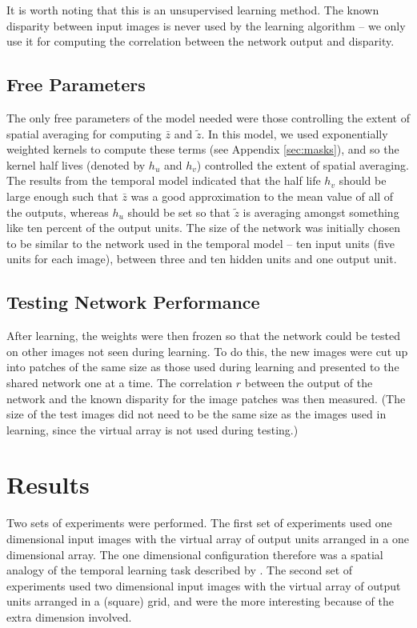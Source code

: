 \documentclass[a4paper]{article}
\newcommand{\zbar}{\bar{z}}
\newcommand{\ztilde}{\tilde{z}}
\begin{document}
It is worth noting that this is an unsupervised learning method. The
known disparity between input images is never used by the learning
algorithm -- we only use it for computing the correlation between the
network output and disparity.



\subsection{Free Parameters}

The only free parameters of the model needed were those controlling
the extent of spatial averaging for computing $\zbar$ and $\ztilde$.
In this model, we used exponentially weighted kernels to compute these
terms (see Appendix \ref{sec:masks}), and so the kernel half lives
(denoted by $h_u$ and $h_v$) controlled the extent of spatial averaging.
The results from the temporal model indicated that the half life $h_v$
should be large enough such that $\zbar$ was a good approximation to
the mean value of all of the outputs, whereas $h_u$ should be set so that
$\ztilde$ is averaging amongst something like ten percent of the output
units.  The size of the network was initially chosen to be similar to
the network used in the temporal model -- ten input units (five units
for each image), between three and ten hidden units and one output
unit.


\subsection{Testing Network Performance}

After learning, the weights were then frozen so that the network could
be tested on other images not seen during learning.  To do this, the
new images were cut up into patches of the same size as those used
during learning and presented to the shared network one at a time.
The correlation $r$ between the output of the network and the known
disparity for the image patches was then measured.  (The size of the
test images did not need to be the same size as the images used in
learning, since the virtual array is not used during testing.)


\section{Results}


Two sets of experiments were performed.  The first set of experiments
used one dimensional input images with the virtual array of output units
arranged in a one dimensional array.  The one dimensional
configuration therefore was a spatial analogy of the temporal learning
task described by \cite{stone95b}.  The second set of experiments used
two dimensional input images with the virtual array of output units
arranged in a (square) grid, and were the more interesting because of
the extra dimension involved.
\end{document}
